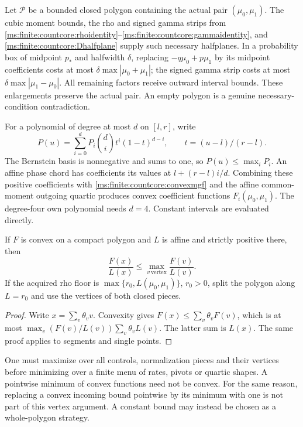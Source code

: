 Let \(\mathcal P\) be a bounded closed polygon containing the actual
pair \((\mu_0,\mu_1)\). The cubic moment bounds, the rho and signed
gamma strips from \eqref{ms:finite:countcore:rhoidentity}--\eqref{ms:finite:countcore:gammaidentity},
and \eqref{ms:finite:countcore:Dhalfplane} supply such necessary halfplanes.
In a probability box of midpoint \(p_*\) and halfwidth \(\delta\),
replacing \(-q\mu_0+p\mu_1\) by its midpoint coefficients costs at
most \(\delta\max|\mu_0+\mu_1|\); the signed gamma strip costs at
most \(\delta\max|\mu_1-\mu_0|\). All remaining factors receive
outward interval bounds. These enlargements preserve the actual pair.
An empty polygon is a genuine necessary-condition contradiction.

For a polynomial of degree at most \(d\) on \([l,r]\), write
\[
 P(u)=\sum_{i=0}^d P_i\binom di t^i(1-t)^{d-i},
 \qquad t=(u-l)/(r-l).
\]
The Bernstein basis is nonnegative and sums to one, so
\(P(u)\le\max_iP_i\). An affine phase chord has coefficients its
values at \(l+(r-l)i/d\). Combining these positive coefficients
with \eqref{ms:finite:countcore:convexmgf} and the affine common-moment outgoing
quartic produces convex coefficient functions \(F_i(\mu_0,\mu_1)\).
The degree-four own polynomial needs \(d=4\). Constant intervals are
evaluated directly.

\begin{lemma}
\label{ms:finite:countcore:vertex}
If \(F\) is convex on a compact polygon and \(L\) is affine and
strictly positive there, then
\[
 \frac{F(x)}{L(x)}\le\max_{v\ \mathrm{vertex}}\frac{F(v)}{L(v)}.
\]
If the acquired rho floor is
\(\max\{r_0,L(\mu_0,\mu_1)\}\), \(r_0>0\), split the polygon
along \(L=r_0\) and use the vertices of both closed pieces.
\end{lemma}
\begin{proof}
Write \(x=\sum_v\theta_vv\). Convexity gives
\(F(x)\le\sum_v\theta_vF(v)\), which is at most
\(\max_v(F(v)/L(v))\sum_v\theta_vL(v)\). The latter sum is
\(L(x)\). The same proof applies to segments and single points.
\end{proof}

One must maximize over all controls, normalization pieces and their
vertices before minimizing over a finite menu of rates, pivots or quartic
shapes. A pointwise minimum of convex functions need not be convex.
For the same reason, replacing a convex incoming bound pointwise by its
minimum with one is not part of this vertex argument. A constant bound
may instead be chosen as a whole-polygon strategy.


